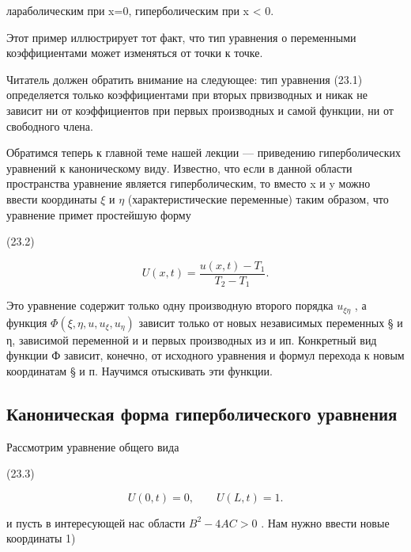 \documentclass[
  ukrainian,
]{article}
\begin{document}
лараболическим при x=0, гиперболическим при x \textless{} 0.

Этот пример иллюстрирует тот факт, что тип уравнения о переменными
коэффициентами может изменяться от точки к точке.

Читатель должен обратить внимание на следующее: тип уравнения (23.1)
определяется только коэффициентами при вторых првизводных и никак не
зависит ни от коэффициентов при первых производных и самой функции, ни
от свободного члена.

Обратимся теперь к главной теме нашей лекции --- приведению
гиперболических уравнений к каноническому виду. Известно, что если в
данной области пространства уравнение является гиперболическим, то
вместо x и y можно ввести координаты \(\xi\) и \(\eta\)
(характеристические переменные) таким образом, что уравнение примет
простейшую форму

(23.2)

\[
U(x,t) = \frac{u(x,t) - T_1}{T_2 - T_1}.
\]

Это уравнение содержит только одну производную второго порядка
\(u_{\xi\eta}\) , а функция \(\Phi(\xi,\eta,u,u_{\xi},u_{\eta})\)
зависит только от новых независимых переменных § и η, зависимой
переменной и и первых производных из и ип. Конкретный вид функции Ф
зависит, конечно, от исходного уравнения и формул перехода к новым
координатам § и п. Научимся отыскивать эти функции.

\subsection{Каноническая форма гиперболического
уравнения}\label{ux43aux430ux43dux43eux43dux438ux447ux435ux441ux43aux430ux44f-ux444ux43eux440ux43cux430-ux433ux438ux43fux435ux440ux431ux43eux43bux438ux447ux435ux441ux43aux43eux433ux43e-ux443ux440ux430ux432ux43dux435ux43dux438ux44f-1}

Рассмотрим уравнение общего вида

(23.3)

\[
U(0,t)=0, \qquad U(L,t)=1.
\]

и пусть в интересующей нас области \(B^2 - 4AC > 0\) . Нам нужно ввести
новые координаты 1)
\end{document}
